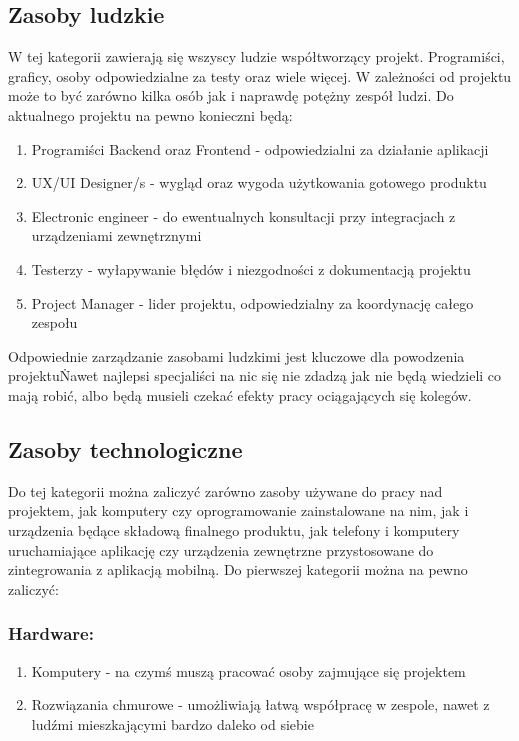 \documentclass[a4paper,12pt]{article}
\begin{document}
    \subsection{Zasoby ludzkie}\label{subsec:zasoby-ludzkie}
    W tej kategorii zawierają się wszyscy ludzie współtworzący projekt.
    Programiści, graficy, osoby odpowiedzialne za testy oraz wiele więcej.
    W zależności od projektu może to być zarówno kilka osób jak i naprawdę potężny zespół ludzi.
    Do aktualnego projektu na pewno konieczni będą:
    \begin{enumerate}
        \item Programiści Backend oraz Frontend - odpowiedzialni za działanie aplikacji
        \item UX/UI Designer/s - wygląd oraz wygoda użytkowania gotowego produktu
        \item Electronic engineer - do ewentualnych konsultacji przy integracjach z urządzeniami zewnętrznymi
        \item Testerzy - wyłapywanie błędów i niezgodności z dokumentacją projektu
        \item Project Manager - lider projektu, odpowiedzialny za koordynację całego zespołu
    \end{enumerate}
    Odpowiednie zarządzanie zasobami ludzkimi jest kluczowe dla powodzenia projektu\. Nawet najlepsi specjaliści na nic
    się nie zdadzą jak nie będą wiedzieli co mają robić, albo będą musieli czekać efekty pracy ociągających się kolegów.


    \subsection{Zasoby technologiczne}\label{subsec:zasoby-technologiczne}
    Do tej kategorii można zaliczyć zarówno zasoby używane do pracy nad projektem, jak komputery czy oprogramowanie zainstalowane na nim,
    jak i urządzenia będące składową finalnego produktu, jak telefony i komputery uruchamiające aplikację czy urządzenia zewnętrzne
    przystosowane do zintegrowania z aplikacją mobilną. Do pierwszej kategorii można na pewno zaliczyć:
    \subsubsection{Hardware:}
    \begin{enumerate}
        \item Komputery - na czymś muszą pracować osoby zajmujące się projektem
        \item Rozwiązania chmurowe - umożliwiają łatwą współpracę w zespole, nawet z ludźmi mieszkającymi bardzo daleko od siebie
    \end{enumerate}
\end{document}
